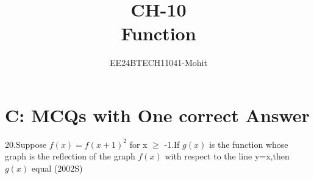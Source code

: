 \documentclass[journal,12pt,twocolumn]{IEEEtran}
\theoremstyle{remark}
\begin{document}

\vspace{3cm}

\title{CH-10\\ Function}
\author{EE24BTECH11041-Mohit}
\maketitle
\newpage
\bigskip

\renewcommand{\thefigure}{\theenumi}
\renewcommand{\thetable}{\theenumi}

\section {C: MCQs with One correct Answer}
20.Suppose $f(x)=f(x+1)^2 $ for x $\geq$ -1.If $g(x)$ is the   function whose graph is the reflection of the graph $f(x)$ with respect to the line y=x,then $g(x)$ equal
\hfill(2002S)\\
\end{document}
